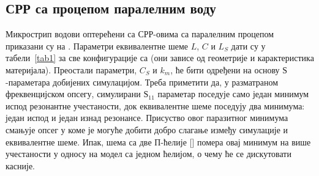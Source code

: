 \subsection{СРР са процепом паралелним воду}\label{sec3:2}
Микрострип водови оптерећени са СРР-овима са паралелним процепом приказани су на .
Параметри еквивалентне шеме $L$, $C$ и $L_S$ дати су у табели~\ref{tab1} за све конфигурације са  (они зависе од геометрије и карактеристика материјала). Преостали параметри, $C_S$ и $k_m$, ће бити одређени на основу $Ѕ$-параметара добијених симулацијом. Треба приметити да, у разматраном фреквенцијском опсегу, симулирани $Ѕ_{11}$ параметар поседује само један минимум испод резонантне учестаности, док еквивалентне шеме поседују два минимума: један испод и један изнад резонансе. Присуство овог паразитног минимума смањује опсег у коме је могуће добити добро слагање између симулације и еквивалентне шеме. Ипак, шема са две П-ћелије [] помера овај минимум на више учестаности у односу на модел са једном ћелијом, о чему ће се дискутовати касније.
